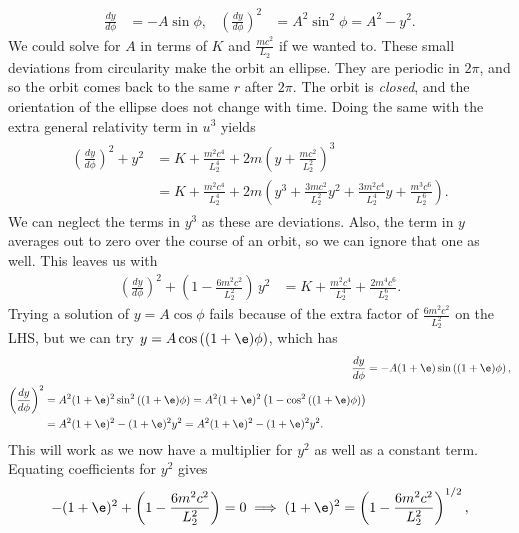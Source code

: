 \documentclass[a4paper, 11pt, normalem]{report}
\begin{document}
\begin{align}
    \frac{dy}{d\phi} &= -A\sin\phi, & \left(\frac{dy}{d\phi}\right)^2 &= A^2\sin^2\phi = A^2-y^2.
\end{align}
We could solve for $A$ in terms of $K$ and $\frac{mc^2}{L_2}$ if we wanted to.
These small deviations from circularity make the orbit an ellipse. 
They are periodic in $2\pi$, and so the orbit comes back to the same $r$ after $2\pi$. 
The orbit is \emph{closed}, and the orientation of the ellipse does not change with time. 
Doing the same with the extra general relativity term in $u^3$ yields
\begin{align}
    \begin{split}
        \left(\frac{dy}{d\phi}\right)^2 + y^2 &= K + \frac{m^2c^4}{L_2^4} + 2m\left(y+\frac{mc^2}{L_2^2}\right)^3 \\
                                              &= K + \frac{m^2c^4}{L_2^4} + 2m\left(y^3+\frac{3mc^2}{L_2^2}y^2 + \frac{3m^2c^4}{L_2^4}y + \frac{m^3c^6}{L_2^6}\right).
    \end{split}
\end{align}
We can neglect the terms in $y^3$ as these are  deviations. 
Also, the term in $y$ averages out to zero over the course of an orbit, so we can ignore that one as well. 
This leaves us with
\begin{align}
    \left(\frac{dy}{d\phi}\right)^2 + \left(1-\frac{6m^2c^2}{L_2^2}\right)\,y^2 &= K + \frac{m^2c^4}{L_2^4} + \frac{2m^4c^6}{L_2^6}.
\end{align}
Trying a solution of $y=A\cos\phi$ fails because of the extra factor of $\frac{6m^2c^2}{L_2^2}$ on the LHS, but we can try $y = A\cos\left((1+\e)\phi\right)$, which has
\begin{align}
    \frac{dy}{d\phi} &= -A(1+\e)\sin\left((1+\e)\phi\right), \\
    \begin{split}
        \left(\frac{dy}{d\phi}\right)^2 &= A^2(1+\e)^2\sin^2\left((1+\e)\phi\right) = A^2(1+\e)^2\left(1-\cos^2\left((1+\e)\phi\right)\right) \\
                                        &= A^2(1+\e)^2-(1+\e)^2y^2 = A^2(1+\e)^2 - (1+\e)^2y^2.
    \end{split}
\end{align}
This will work as we now have a multiplier for $y^2$ as well as a constant term. 
Equating coefficients for $y^2$ gives
\begin{align}
    -(1+\e)^2 + \left(1-\frac{6m^2c^2}{L_2^2}\right) = 0 \implies (1+\e)^2 = \left(1-\frac{6m^2c^2}{L_2^2}\right)^{1/2},
\end{align}
\end{document}
